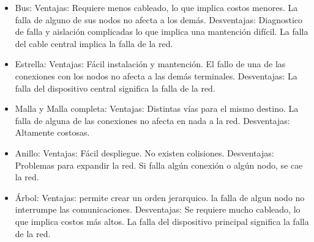\documentclass{article}
\begin{document}
\begin{enumerate}
    \begin{itemize}
    \item Bus:
	\newline Ventajas:
	\newline 	Requiere menos cableado, lo que implica costos menores.
	\newline 	La falla de alguno de sus nodos no afecta a los demás.
	\newline Desventajas:
	\newline 	Diagnostico de falla y aislación complicadas lo que \newline implica una mantención difícil.
	\newline 	La falla del cable central implica la falla de la red.\\
\item Estrella:
	\newline Ventajas:
	\newline 	Fácil instalación y mantención.
	\newline 	El fallo de una de las conexiones con los nodos no afecta a las demás terminales.
	\newline Desventajas:
	\newline 	La falla del dispositivo central significa la falla de la red.\\
\item Malla y Malla completa:
	\newline Ventajas:
	\newline 	Distintas vías para el mismo destino.
	\newline 	La falla de alguna de las conexiones no afecta en nada a la red.
	\newline Desventajas:
	\newline 	Altamente costosas.\\
\item Anillo:
	\newline Ventajas:
	\newline 	Fácil despliegue.
	\newline 	No existen colisiones.
	\newline Desventajas:
	\newline 	Problemas para expandir la red.
	\newline 	Si falla algún conexión o algún nodo, se cae la red.\\
	\newpage
\item Árbol:
	\newline Ventajas:
	\newline 	permite crear un orden jerarquico.
	\newline 	la falla de algun nodo no interrumpe las comunicaciones.
	\newline Desventajas:
	\newline 	Se requiere mucho cableado, lo que implica costos más altos.
	\newline 	La falla del dispositivo principal significa la falla de la red.
    \end{itemize}
    

\end{enumerate}
\end{document}
